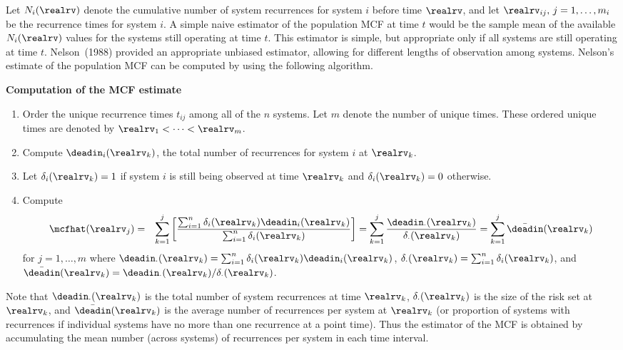 Let $N_{i}(\realrv)$ denote the cumulative number of system recurrences
for system $i$ before time $\realrv$, and let $\realrv_{ij},\, j=1, \dots,
m_{i}$ be the recurrence times for system
$i$. A simple naive estimator of the 
population MCF at time $t$ would be the sample
mean of the available $N_{i}(\realrv)$ values for the systems still
operating at time $t$.  This estimator is simple, but appropriate only
if all systems are still operating at time $t$.  Nelson~(1988)
provided an appropriate unbiased estimator, allowing for different lengths 
of observation among systems. Nelson's estimate of the 
population MCF can be computed by using the following algorithm. 
 
\begin{algorithm}
{\bfseries Computation of the MCF estimate}
\label{algorithm:np.repair.estimate}
\begin{enumerate}
\item
Order the unique recurrence times $t_{ij}$ among all of the $n$
systems. Let $m$ denote the number of unique times. These ordered
unique times are denoted by $\realrv_{1}<
\dots < \realrv_{m}$.
\item
Compute $\deadin_{i}(\realrv_{k})$, the total number
of recurrences for system $i$ at $\realrv_{k}$.
\item
Let $\delta_{i}(\realrv_{k})=1$ if system $i$ is
still being observed at time $\realrv_{k}$ and
$\delta_{i}(\realrv_{k})=0$ otherwise.
\item
Compute
\begin{eqnarray}
\label{equation:mcfhat}
\mcfhat(\realrv_{j})&=&\sum_{k=1}^{j}\left [\frac{
\sum_{i=1}^{n} \delta_{i}(\realrv_{k}) 
               \deadin_{i}(\realrv_{k})}     
{\sum_{i=1}^{n} \delta_{i}(\realrv_{k})  }\right ]=\sum_{k=1}^{j}
\frac{\deadin_{\cdot}(\realrv_{k})      }
{\delta_{\cdot}(\realrv_{k})}=\sum_{k=1}^{j} \bar{\deadin}(\realrv_{k})
\end{eqnarray}
for $j=1, \dots, m$ where
$\deadin_{\cdot}(\realrv_{k})=
\sum_{i=1}^{n}\delta_{i}(\realrv_{k})
\deadin_{i}(\realrv_{k})$,
$\delta_{\cdot}(\realrv_{k})=\sum_{i=1}^{n} \delta_{i}(\realrv_{k})$,
and $\bar{\deadin}(\realrv_{k})=
\deadin_{\cdot}(\realrv_{k})/
\delta_{\cdot}(\realrv_{k})$.
\end{enumerate}
Note that $\deadin_{\cdot}(\realrv_{k})$ is the total number of
system recurrences at time $\realrv_{k}$,
$\delta_{\cdot}(\realrv_{k})$ is the size of the risk set at
$\realrv_{k}$, and $\bar{\deadin}(\realrv_{k})$ is the average
number of recurrences per system at $\realrv_{k}$ (or proportion of
systems with recurrences if individual systems have no more than one
recurrence at a point time). Thus the estimator of the MCF is
obtained by accumulating the mean number (across systems) of
recurrences per system in each time interval.
\end{algorithm}

